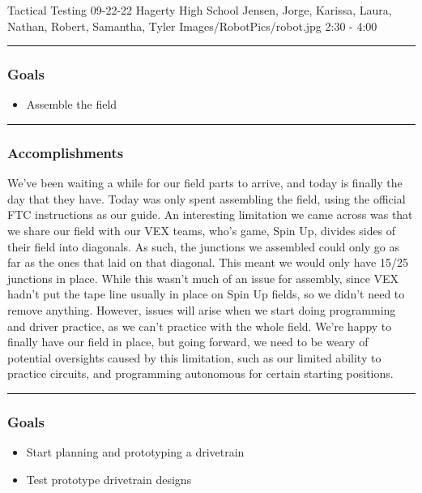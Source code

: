 \insertmeeting 
	{Tactical Testing} 
	{09-22-22}
	{Hagerty High School}
	{Jensen, Jorge, Karissa, Laura, Nathan, Robert, Samantha, Tyler}
	{Images/RobotPics/robot.jpg}
	{2:30 - 4:00}
	
\noindent\hfil\rule{\textwidth}{.4pt}\hfil
\subsubsection*{Goals}
\begin{itemize}
    \item Assemble the field

\end{itemize} 

\noindent\hfil\rule{\textwidth}{.4pt}\hfil

\subsubsection*{Accomplishments}
We've been waiting a while for our field parts to arrive, and today is finally the day that they have. Today was only spent assembling the field, using the official FTC instructions as our guide. An interesting limitation we came across was that we share our field with our VEX teams, who's game, Spin Up, divides sides of their field into diagonals. As such, the junctions we assembled could only go as far as the ones that laid on that diagonal. This meant we would only have 15/25 junctions in place. While this wasn't much of an issue for assembly, since VEX hadn't put the tape line usually in place on Spin Up fields, so we didn't need to remove anything. However, issues will arise when we start doing programming and driver practice, as we can't practice with the whole field. We're happy to finally have our field in place, but going forward, we need to be weary of potential oversights caused by this limitation, such as our limited ability to practice circuits, and programming autonomous for certain starting positions.

\noindent\hfil\rule{\textwidth}{.4pt}\hfil
\subsubsection*{Goals}
\begin{itemize}
    \item Start planning and prototyping a drivetrain
    \item Test prototype drivetrain designs
    
\end{itemize} 

